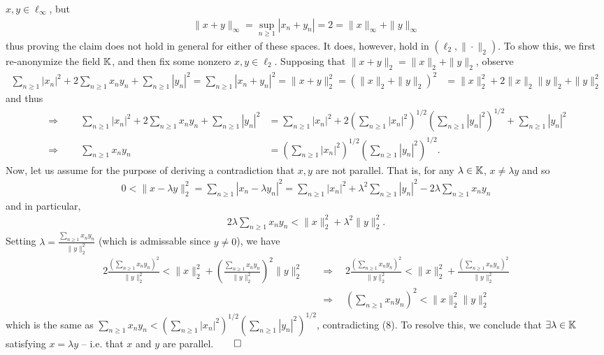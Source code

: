 \documentclass[10pt]{article}
\newcommand{\1}[1]{\mathbbm{1}_{#1}} \newcommand{\mc}[1]{\mathcal{#1}}
\begin{document}
    $x,y\in\ell_\infty$, but
    \begin{align*}
        \|x+y\|_\infty=\sup_{n\geq 1}|x_n+y_n|=2=\|x\|_\infty+\|y\|_\infty
    \end{align*}
    thus proving the claim does not hold in general for either of these spaces.
    It does, however, hold in $(\ell_2,\|\cdot\|_2)$. To show this, we first
    re-anonymize the field $\mathbb{K}$, and then fix some nonzero $x,y\in\ell_2$.
    Supposing that $\|x+y\|_2=\|x\|_2+\|y\|_2$, observe
    \begin{align*}
        \sum_{n\geq 1}|x_n|^2+2\sum_{n\geq 1}x_ny_n+\sum_{n\geq 1}|y_n|^2=\sum_{n\geq 1}|x_n+y_n|^2=\|x+y\|^2_2=(\|x\|_2+\|y\|_2)^2&=\|x\|^2_2+2\|x\|_2\|y\|_2+\|y\|_2^2
    \end{align*}
    and thus
    \begin{align*}
        \Rightarrow\qquad\sum_{n\geq 1}|x_n|^2+2\sum_{n\geq 1}x_ny_n+\sum_{n\geq 1}|y_n|^2&=\sum_{n\geq 1}|x_n|^2+2\left(\sum_{n\geq 1}|x_n|^2\right)^{1/2}\left(\sum_{n\geq 1}|y_n|^2\right)^{1/2}+\sum_{n\geq 1}|y_n|^2\\
        \Rightarrow\qquad\sum_{n\geq 1}x_ny_n&=\left(\sum_{n\geq 1}|x_n|^2\right)^{1/2}\left(\sum_{n\geq 1}|y_n|^2\right)^{1/2}.\tag{8}
    \end{align*}
    Now, let us assume for the purpose of deriving a contradiction that $x,y$
    are not parallel. That is, for any $\lambda\in\mathbb{K}$, $x\neq \lambda y$
    and so
    \begin{align*}
        0<\|x-\lambda y\|_2^2=\sum_{n\geq 1}|x_n-\lambda y_n|^2=\sum_{n\geq 1}|x_n|^2+\lambda^2\sum_{n\geq 1}|y_n|^2-2\lambda\sum_{n\geq 1}x_ny_n
    \end{align*}
    and in particular,
    \begin{align*}
        2\lambda\sum_{n\geq 1}x_ny_n<\|x\|^2_2+\lambda^2\|y\|_2^2.
    \end{align*}
    Setting $\lambda=\frac{\sum_{n\geq 1}x_ny_n}{\|y\|_2^2}$ (which is
    admissable since $y\neq 0$), we have
    \begin{align*}
        2\frac{\left(\sum_{n\geq 1}x_ny_n\right)^2}{\|y\|^2_2}<\|x\|^2_2+\left(\frac{\sum_{n\geq 1}x_ny_n}{\|y\|^2_2}\right)^2\|y\|^2_2\quad&\Rightarrow\quad2\frac{\left(\sum_{n\geq 1}x_ny_n\right)^2}{\|y\|^2_2}<\|x\|^2_2+\frac{\left(\sum_{n\geq 1}x_ny_n\right)^2}{\|y\|^2_2}\\
        &\Rightarrow\quad\left(\sum_{n\geq 1}x_ny_n\right)^2<\|x\|^2_2\|y\|^2_2
    \end{align*}
    which is the same as $\sum_{n\geq 1}x_ny_n<(\sum_{n\geq
    1}|x_n|^2)^{1/2}(\sum_{n\geq 1}|y_n|^2)^{1/2}$, contradicting (8). To
    resolve this, we conclude that $\exists\lambda\in\mathbb{K}$ satisfying
    $x=\lambda y$ -- i.e. that $x$ and $y$ are parallel.\hfill{$\qed$}
    \newpage
    
    
\end{document}
